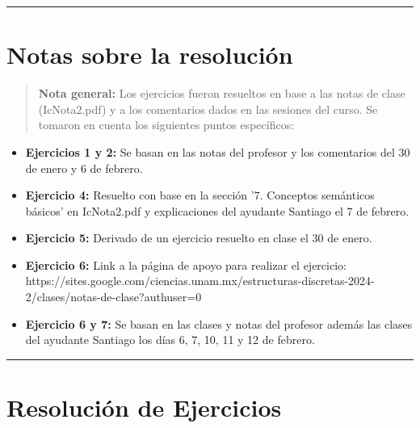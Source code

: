 \documentclass[11pt,letterpaper]{article}
\begin{document}
\bigskip
\hrule height 0.1pt
\bigskip

\section*{Notas sobre la resolución}

\begin{quote}
  \textbf{Nota general:}  
  Los ejercicios fueron resueltos en base a las notas de clase (IcNota2.pdf) y a los comentarios dados en las sesiones del curso. Se tomaron en cuenta los siguientes puntos específicos:  
\end{quote}

\begin{itemize}
   \item \textbf{Ejercicios 1 y 2:} Se basan en las notas del profesor y los comentarios del 30 de enero y 6 de febrero.  
   \item \textbf{Ejercicio 4:} Resuelto con base en la sección '7. Conceptos semánticos básicos' en IcNota2.pdf y explicaciones del ayudante Santiago el 7 de febrero.
   \item \textbf{Ejercicio 5:} Derivado de un ejercicio resuelto en clase el 30 de enero.
   \item \textbf{Ejercicio 6:} Link a la página de apoyo para realizar el ejercicio: https://sites.google.com/ciencias.unam.mx/estructuras-discretas-2024-2/clases/notas-de-clase?authuser=0
   \item \textbf{Ejercicio 6 y 7:} Se basan en las clases y notas del profesor además las clases del ayudante Santiago los días 6, 7, 10, 11 y 12 de febrero.
\end{itemize}

\bigskip
\hrule height 0.1pt
\bigskip

\section*{Resolución de Ejercicios}
\end{document}
